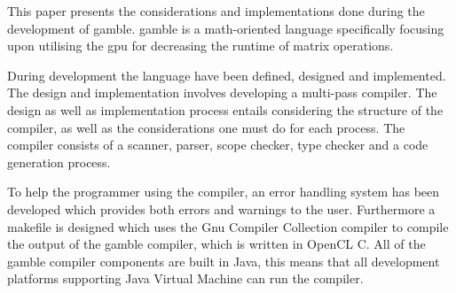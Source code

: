 This paper presents the considerations and implementations done during the development of \gls{gamble}.
\gls{gamble} is a math-oriented language specifically focusing upon utilising the \acrshort{gpu} for decreasing the runtime of matrix operations.

During development the language have been defined, designed and implemented.
The design and implementation involves developing a multi-pass compiler.
The design as well as implementation process entails considering the structure of the compiler, as well as the considerations one must do for each process.
The compiler consists of a scanner, parser, scope checker, type checker and a code generation process.

To help the programmer using the compiler, an error handling system has been developed which provides both errors and warnings to the user.
Furthermore a makefile is designed which uses the Gnu Compiler Collection compiler to compile the output of the \gls{gamble} compiler, which is written in OpenCL C.
All of the \gls{gamble} compiler components are built in Java, this means that all development platforms supporting Java Virtual Machine can run the compiler.
